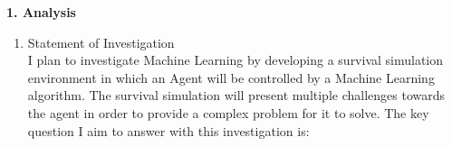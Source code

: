 \begin{flushleft}
    \huge
    \textbf{1. Analysis}
    \vspace{0.1cm}
    \Large
    \begin{enumerate}
        \item Statement of Investigation\\
        \large
        I plan to investigate Machine Learning by developing a survival simulation environment in which an Agent will be controlled by a Machine Learning algorithm. The survival simulation will present multiple challenges towards the agent in order to provide a complex problem for it to solve. The key question I aim to answer with this investigation is:

    \end{enumerate}
\end{flushleft}